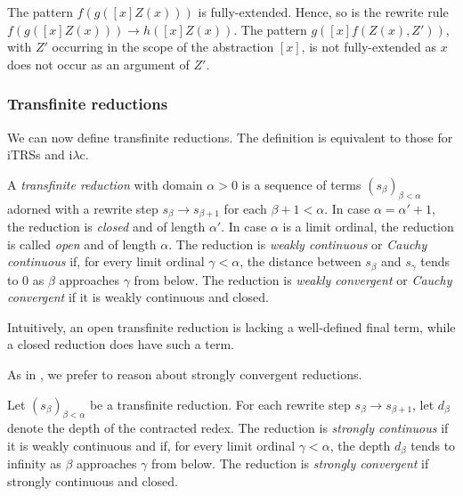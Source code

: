 \documentclass{LMCS}
\theoremstyle{definition}
\newcommand{\rew}{\rightarrow}
\newcommand{\iLC}{i$\lambda$c\xspace}
\begin{document}
\begin{exa}
The pattern $f(g([x]Z(x)))$ is fully-extended. Hence, so is the rewrite
rule $f(g([x]Z(x))) \rightarrow h([x]Z(x))$. The pattern $g([x]f(Z(x),Z'))$, with $Z'$ occurring in the scope of the abstraction $[x]$, is not fully-extended as $x$ does not occur as an argument of $Z'$.
\end{exa}



\subsubsection{Transfinite reductions}

We can now define transfinite reductions.
The definition is equivalent to those for iTRSs and \iLC \cite{KKSV95,KKSV97}.
\begin{defi}
A \emph{transfinite reduction} with domain $\alpha > 0$ is a sequence
of terms $(s_\beta)_{\beta < \alpha}$ adorned with a rewrite step
$s_\beta \rew s_{\beta + 1}$ for each $\beta + 1 < \alpha$. In case $\alpha = \alpha' + 1$,
the reduction is \emph{closed} and of length $\alpha'$. In case
$\alpha$ is a limit ordinal, the reduction is called \emph{open} and
of length $\alpha$. The reduction is \emph{weakly continuous} or
\emph{Cauchy continuous} if, for every limit ordinal $\gamma < \alpha$, the distance between $s_\beta$ and $s_\gamma$ tends to $0$ as $\beta$ approaches $\gamma$ from below. The reduction is \emph{weakly convergent} or \emph{Cauchy convergent} if it is weakly continuous and closed.
\end{defi}
\noindent Intuitively, an open transfinite reduction is lacking a well-defined final term, while a closed reduction does have such a term. 

As in \cite{KKSV95,KKSV97,T03_KV}, we prefer to reason about strongly
convergent reductions.

\begin{defi}
Let $(s_\beta)_{\beta < \alpha}$ be a transfinite reduction. For each
rewrite step $s_\beta \rew s_{\beta + 1}$, let $d_\beta$ denote the
depth of the contracted redex. The reduction is \emph{strongly
  continuous} if it is weakly continuous and if, for every limit ordinal $\gamma < \alpha$, the depth $d_\beta$ tends to infinity as $\beta$ approaches $\gamma$ from below. The reduction is \emph{strongly convergent} if strongly continuous and closed.
\end{defi}
\end{document}

